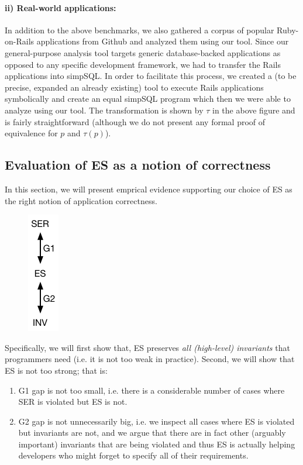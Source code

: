 \documentclass[12pt,letter]{article}
\begin{document}
\paragraph{ii) Real-world applications:} 
In addition to the above benchmarks, we also
gathered a corpus of popular Ruby-on-Rails applications from Github and
analyzed them using our tool. Since our general-purpose analysis tool
targets
generic database-backed applications as opposed to any specific development
framework, we had to transfer the Rails applications into simpSQL. In order
to
facilitate this process, we created a (to be precise, expanded an already
existing)
tool to execute Rails applications symbolically and create an equal simpSQL
program which then we were able to analyze using our tool. The
transformation is
shown by $\tau$ in the above figure and is fairly straightforward (although
we
do not present any formal proof of equivalence for $p$ and $\tau(p)$).

\subsection{Evaluation of ES as a notion of correctness}
In this section, we will present emprical evidence supporting our choice of ES
as the right notion of application correctness. 

\begin{figure}
  \begin{center}
    \includegraphics[scale=0.5]{figures/gaps.png}
  \end{center}
\end{figure}
Specifically, we will first show that,
ES preserves \emph{all (high-level) invariants} that programmers need (i.e. it
is not too weak in practice). 
Second, we will  show that ES is not too strong; that is: 
\begin{enumerate}
  \item G1 gap is not too small, i.e. there is a considerable number of cases where SER is violated 
        but ES is not. 
  \item G2 gap is not unnecessarily big, i.e. we inspect all cases where ES is
    violated but invariants are not, and we argue that there are in fact
    other (arguably important) invariants that are being violated and thus
    ES is actually helping developers who might forget to specify all of
    their requirements.
\end{enumerate}
\end{document}
